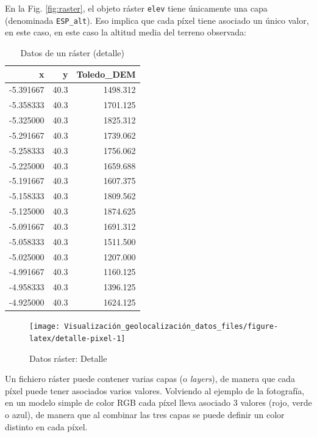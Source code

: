 \documentclass[
]{book}
\theoremstyle{definition}
\theoremstyle{definition}
\theoremstyle{definition}
\theoremstyle{definition}
\theoremstyle{remark}
\begin{document}
En la Fig. \ref{fig:raster}, el objeto ráster \texttt{elev} tiene únicamente una capa
(denominada \texttt{ESP\_alt}). Eso implica que cada píxel tiene asociado un único
valor, en este caso, en este caso la altitud media del terreno observada:

\begin{table}

\caption{\label{tab:detalle-pixel}Datos de un ráster (detalle)}
\centering
\begin{tabular}[t]{r|r|r}
\hline
x & y & Toledo\_DEM\\
\hline
-5.391667 & 40.3 & 1498.312\\
\hline
-5.358333 & 40.3 & 1701.125\\
\hline
-5.325000 & 40.3 & 1825.312\\
\hline
-5.291667 & 40.3 & 1739.062\\
\hline
-5.258333 & 40.3 & 1756.062\\
\hline
-5.225000 & 40.3 & 1659.688\\
\hline
-5.191667 & 40.3 & 1607.375\\
\hline
-5.158333 & 40.3 & 1809.562\\
\hline
-5.125000 & 40.3 & 1874.625\\
\hline
-5.091667 & 40.3 & 1691.312\\
\hline
-5.058333 & 40.3 & 1511.500\\
\hline
-5.025000 & 40.3 & 1207.000\\
\hline
-4.991667 & 40.3 & 1160.125\\
\hline
-4.958333 & 40.3 & 1396.125\\
\hline
-4.925000 & 40.3 & 1624.125\\
\hline
\end{tabular}
\end{table}

\begin{figure}

{\centering \texttt{[image: Visualización\_geolocalización\_datos\_files/figure-latex/detalle-pixel-1]} 

}

\caption{Datos ráster: Detalle}\label{fig:detalle-pixel}
\end{figure}

Un fichiero ráster puede contener varias capas (o \emph{layers}), de manera que cada
píxel puede tener asociados varios valores. Volviendo al ejemplo de la
fotografía, en un modelo simple de color RGB cada píxel lleva asociado 3 valores
(rojo, verde o azul), de manera que al combinar las tres capas se puede definir
un color distinto en cada píxel.
\end{document}
